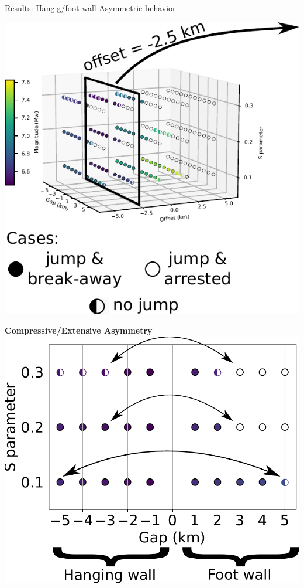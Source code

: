 \documentclass{beamer}
\begin{document}
\begin{frame}
 {Results: Hangig/foot wall Asymmetric behavior}
 
 \begin{minipage}{0.45\linewidth}
  \includegraphics[width=1\linewidth]{images/tests_shmax340_1plane2}
 \end{minipage} \pause
 \begin{minipage}{0.5\linewidth}
  \vskip -0.1cm
  \begin{center}
  \textbf{Compressive/Extensive Asymmetry}
  \vskip 0.2cm
  \includegraphics[width=0.9\linewidth]{images/tests_asym} \pause   

\end{center}
\end{minipage}
\end{frame}
\end{document}
